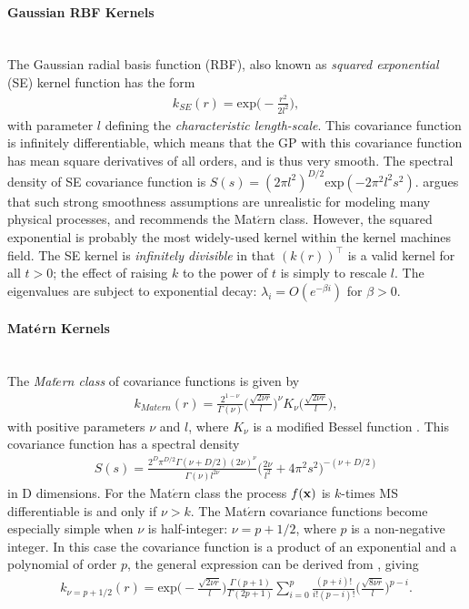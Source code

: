 \documentclass[article]{jss}
\begin{document}
\paragraph{Gaussian RBF Kernels}\mbox{}\\
The Gaussian radial basis function (RBF), also known as \emph{squared exponential} (SE) kernel function has the form
\begin{align*}
k_{SE}(r)=\mbox{exp}\Big(-\frac{r^2}{2l^2}\Big),
\end{align*}
with parameter $l$ defining the \emph{characteristic length-scale}. This covariance function is infinitely differentiable, which means that the GP with this covariance function has mean square derivatives of all orders, and is thus very smooth. The spectral density of SE covariance function is $S(s)=(2\pi l^2)^{D/2}\mbox{exp}(-2\pi^2l^2s^2)$. \citep{stein_interpolation_1999} argues that such strong smoothness assumptions are unrealistic for modeling many physical processes, and recommends the Mat$\acute{e}$rn class. However, the squared exponential is probably the most widely-used kernel within the kernel machines field. The SE kernel is \emph{infinitely divisible} in that $(k(r))^\top$ is a valid kernel for all $t>0$; the effect of raising $k$ to the power of $t$ is simply to rescale $l$. The eigenvalues are subject to exponential decay: $\lambda_i=O(e^{-\beta i})$ for $\beta>0$.

\paragraph{Mat$\acute{{\bf e}}$rn Kernels}\mbox{}\\
The \emph{Mat$\acute{e}$rn class} of covariance functions is given by
\begin{align*}
k_{Matern}(r)=\frac{2^{1-\nu}}{\Gamma(\nu)}\Big(\frac{\sqrt{2\nu r}}{l}\Big)^\nu K_\nu \Big(\frac{\sqrt{2\nu r}}{l}\Big),
\end{align*}
with positive parameters $\nu$ and $l$, where $K_\nu$ is a modified Bessel function \citep{abramowitz_handbook_1974}. This covariance function has a spectral density
\begin{align*}
S(s)=\frac{2^D\pi^{D/2}\Gamma(\nu+D/2)(2\nu)^\nu}{\Gamma(\nu)l^{2\nu}}\Big(\frac{2\nu}{l^2}+4\pi^2s^2\Big)^{-(\nu+D/2)}
\end{align*}
in D dimensions. For the Mat$\acute{e}$rn class the process $f({\bf x})$ is $k$-times MS differentiable is and only if $\nu>k$. The Mat$\acute{e}$rn covariance functions become especially simple when $\nu$ is half-integer: $\nu=p+1/2$, where $p$ is a non-negative integer. In this case the covariance function is a product of an exponential and a polynomial of order $p$, the general expression can be derived from \citep{abramowitz_handbook_1974}, giving
\begin{align*}
k_{\nu=p+1/2}(r)=\mbox{exp}\Big(-\frac{\sqrt{2\nu r}}{l}\Big)\frac{\Gamma(p+1)}{\Gamma(2p+1)}\sum_{i=0}^p \frac{(p+i)!}{i!(p-i)!}\Big(\frac{\sqrt{8\nu r}}{l}\Big)^{p-i}.
\end{align*}
\end{document}
